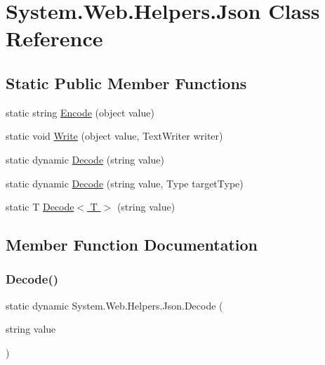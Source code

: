 \hypertarget{classSystem_1_1Web_1_1Helpers_1_1Json}{}\section{System.\+Web.\+Helpers.\+Json Class Reference}
\label{classSystem_1_1Web_1_1Helpers_1_1Json}
\subsection*{Static Public Member Functions}
\begin{DoxyCompactItemize}
\item 
static string \hyperlink{classSystem_1_1Web_1_1Helpers_1_1Json_a5234a572ff14b4546aca4a7ff265e9b5}{Encode} (object value)
\item 
static void \hyperlink{classSystem_1_1Web_1_1Helpers_1_1Json_a461c4677a0c7755a390cbe247d2cb106}{Write} (object value, Text\+Writer writer)
\item 
static dynamic \hyperlink{classSystem_1_1Web_1_1Helpers_1_1Json_a3a8e1162819227b88cbd2879cc05ecec}{Decode} (string value)
\item 
static dynamic \hyperlink{classSystem_1_1Web_1_1Helpers_1_1Json_ab39872b59b78d9c417d2d81504768849}{Decode} (string value, Type target\+Type)
\item 
static T \hyperlink{classSystem_1_1Web_1_1Helpers_1_1Json_abd82655d76fcb16522303f1da4ced6c0}{Decode$<$ T $>$} (string value)
\end{DoxyCompactItemize}


\subsection{Member Function Documentation}
\mbox{\label{classSystem_1_1Web_1_1Helpers_1_1Json_a3a8e1162819227b88cbd2879cc05ecec}} 
\subsubsection{\texorpdfstring{Decode()}{Decode()}\hspace{0.1cm}{\footnotesize\ttfamily [1/2]}}
{\footnotesize\ttfamily static dynamic System.\+Web.\+Helpers.\+Json.\+Decode (\begin{DoxyParamCaption}\item[{string}]{value }\end{DoxyParamCaption})\hspace{0.3cm}{\ttfamily [static]}}

